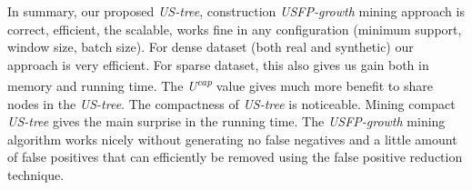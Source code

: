 \documentclass[conference]{IEEEtran}
\begin{document}

In summary, our proposed \emph{US-tree}, construction \emph{USFP-growth} mining approach is correct, efficient, the scalable, works fine in any configuration (minimum support, window size, batch size). For dense dataset (both real and synthetic) our approach is very efficient. For sparse dataset, this also gives us gain both in memory and running time. The \emph{U\textsuperscript{cap}} value gives much more benefit to share nodes in the \emph{US-tree}. The compactness of \emph{US-tree} is noticeable. Mining compact \emph{US-tree} gives the main surprise in the running time. The \emph{USFP-growth} mining algorithm works nicely without generating no false negatives and a little amount of false positives that can efficiently be removed using the false positive reduction technique.
\end{document}
